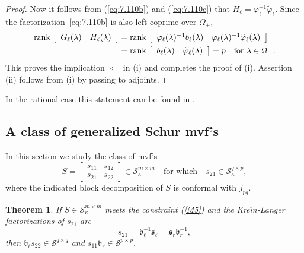 \documentclass[12pt,twoside,a4paper]{amsart}
\newtheorem{thm}{Theorem}[section]
\theoremstyle{definition}
\numberwithin{equation}{section}
\begin{document}
\begin{proof}
Now it follows from (\ref{eq:7.110b}) and (\ref{eq:7.110c}) that
$H_\ell= \varphi_\ell^{-1}{{{\widetilde \varphi} }}_\ell$. Since the
factorization~\eqref{eq:7.110b} is also left coprime over
$\Omega_+$,
\[
\begin{split}
{{\rm rank\,}} \left[\begin{array}{cc}
 G_\ell({\lambda}) & H_\ell({\lambda})
\end{array}\right]
&={{\rm rank\,}} \left[\begin{array}{cc}
 \varphi_\ell({\lambda})^{-1}b_\ell ({\lambda})& \varphi_\ell({\lambda})^{-1}{{{\widetilde \varphi} }}_\ell ({\lambda})
\end{array}\right]\\
&={{\rm rank\,}} \left[\begin{array}{cc}
b_\ell ({\lambda})& {{{\widetilde \varphi} }}_\ell ({\lambda})
\end{array}\right]=p
 \quad \text{for} \ {\lambda}\in\Omega_+.
 \end{split}
\]
This proves the implication $\Leftarrow$ in (i) and completes the proof of       (i). Assertion (ii) follows from (i) by passing to adjoints.
\end{proof}
In the rational case this statement can be found in \cite[Theorem 11.1.4]{BGR}.
\subsection{A class of generalized Schur mvf's}
In this section we study the
class of mvf's
\begin{equation}
\label{M5}
S=\begin{bmatrix}s_{11}&s_{12}\\s_{21}&s_{22}\end{bmatrix}
\in{{\mathcal S}}^{m\times m}_\kappa \quad\text{for which}\quad s_{21}\in{\mathcal S}^{q\times p}_\kappa,
\end{equation}
where the indicated block decomposition of $S$ is conformal with $j_{pq}$.

\begin{thm}
\label{thm:11.2} If
$S\in{{\mathcal S}}^{m\times m}_\kappa$ meets the constraint (\ref{M5})
 and the  Kre\u{\i}n-Langer factorizations of $s_{21}$ are
\begin{equation}\label{M6}
 s_{21}={{\mathfrak b}}_{\ell}^{-1}{{\mathfrak s}}_{\ell}={{\mathfrak s}}_r{{\mathfrak b}}_r^{-1},
 \end{equation}
then ${{\mathfrak b}}_{\ell}s_{22}\in {{\mathcal S}}^{q\times q}$ and $s_{11}{{\mathfrak b}}_r\in
{{\mathcal S}}^{p\times p}$.
\end{thm}
\end{document}

